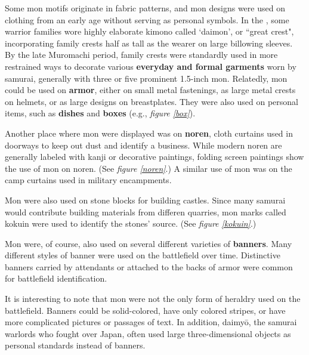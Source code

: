 \documentclass{article}
\begin{document}
  Some mon motifs
  originate in fabric patterns, and mon designs were used on
  clothing from an early age without serving as personal symbols.  In the \MuromachiPeriod, some warrior
  families wore highly elaborate kimono called `daimon', or
  ``great crest", incorporating family crests half as tall as the
  wearer on large billowing sleeves. By the late
  Muromachi period, family crests were standardly used in more
  restrained ways to decorate various \textbf{everyday and formal garments}
  worn by samurai, generally with three or five prominent 1.5-inch
  mon.  Relatedly, mon could be used on \textbf{armor},
  either on small metal fastenings, as large metal crests on helmets,
  or as large designs on breastplates. They were also used on personal items,
  such as \textbf{dishes} and \textbf{boxes} (e.g., \emph{figure \ref{box}}).

  Another place where mon were displayed was on \textbf{noren}, cloth curtains used 
  in doorways to keep out dust and identify a business.  While modern 
  noren are generally labeled with kanji or decorative paintings, 
  \MomoyamaPeriod{} folding screen paintings show the use of 
  mon on noren. (See \emph{figure \ref{noren}}.)
  A similar use of mon was on
  the camp curtains used in military encampments.

  Mon were also used on stone blocks for building castles. Since many
  samurai would contribute building materials from differen quarries,
  mon marks called kokuin were used to identify the stones' source.
  (See \emph{figure \ref{kokuin}}.)

  \begin{figure}[t]
  \begin{subfigs}
  \end{subfigs}
  \end{figure}

  Mon were, of course, also used on several different varieties of
  \textbf{banners}.  Many different styles of banner were used on the
  battlefield over time. Distinctive banners carried by attendants or
  attached to the backs of armor were common for battlefield
  identification.

  It is interesting to note that mon were not the only form of
  heraldry used on the battlefield.  Banners could be solid-colored,
  have only colored stripes, or have more complicated pictures or
  passages of text.  In addition, daimyō, the samurai warlords who
  fought over \SengokuPeriod{} Japan, often used large three-dimensional
  objects as personal standards instead of banners.
\end{document}

